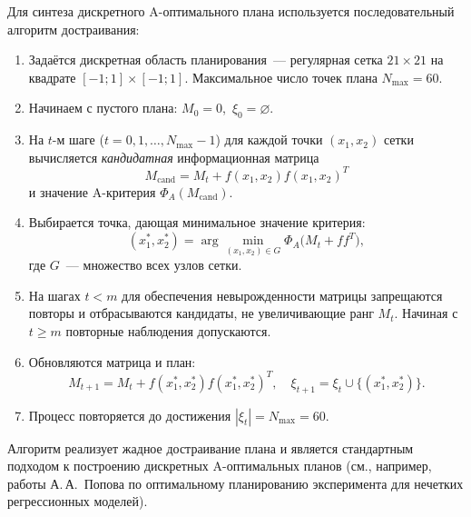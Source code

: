 \documentclass[a4paper,12pt]{article}
\begin{document}
Для синтеза дискретного A-оптимального плана используется
последовательный алгоритм достраивания:

\begin{enumerate}
\item Задаётся дискретная область планирования~--- регулярная сетка
      $21\times 21$ на квадрате $[-1;1]\times[-1;1]$.
      Максимальное число точек плана $N_{\max}=60$.

\item Начинаем с пустого плана:
      $M_0 = 0$, $\,\xi_0 = \varnothing$.

\item На $t$-м шаге ($t=0,1,\dots,N_{\max}-1$) для
      каждой точки $(x_1,x_2)$ сетки
      вычисляется \emph{кандидатная} информационная матрица
      \begin{equation}
      M_{\text{cand}} = M_t + f(x_1,x_2) f(x_1,x_2)^T
      \end{equation}
      и значение A-критерия
      $\Phi_A(M_{\text{cand}})$.

\item Выбирается точка, дающая минимальное значение критерия:
      \begin{equation}
      (x_1^{*},x_2^{*}) =
      \arg\min_{(x_1,x_2)\in G}
      \Phi_A\bigl(M_t + f f^T\bigr),
      \end{equation}
      где $G$~--- множество всех узлов сетки.

\item На шагах $t<m$ для обеспечения невырожденности матрицы
      запрещаются повторы и отбрасываются кандидаты, не увеличивающие
      ранг $M_t$. Начиная с $t\ge m$ повторные наблюдения допускаются.

\item Обновляются матрица и план:
      \begin{equation}
      M_{t+1} = M_t + f(x_1^{*},x_2^{*}) f(x_1^{*},x_2^{*})^T,\quad
      \xi_{t+1} = \xi_t \cup \{(x_1^{*},x_2^{*})\}.
      \end{equation}

\item Процесс повторяется до достижения $|\xi_t| = N_{\max}=60$.
\end{enumerate}

Алгоритм реализует жадное достраивание плана и является
стандартным подходом к построению дискретных A-оптимальных планов
(см., например, работы А.\,А.~Попова по оптимальному планированию
эксперимента для нечетких регрессионных моделей).
\end{document}
